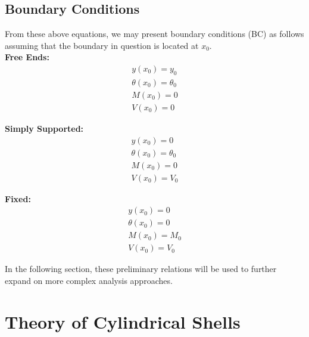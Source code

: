 \subsection{Boundary Conditions}

From these above equations, we may present boundary conditions (BC) as follows assuming that the boundary in question is located at $x_0$.\\

\textbf{Free Ends:}\\
\begin{equation}
	\label{eq:2_freeBC}
	\begin{aligned}
		y(x_0) = y_0          \\
		\theta(x_0)= \theta_0 \\
		M(x_0) = 0            \\
		V(x_0) = 0            
	\end{aligned}
\end{equation}

\textbf{Simply Supported:}\\
\begin{equation}
	\label{eq:2_endBC}
	\begin{aligned}
		y(x_0)= 0            \\
		\theta(x_0)=\theta_0 \\
		M(x_0)= 0            \\
		V(x_0) =V_0          
	\end{aligned}
\end{equation}

\textbf{Fixed:}\\
\begin{equation}
	\label{eq:2_fixedBC}
	\begin{aligned}
		y(x_0)=0      \\
		\theta(x_0)=0 \\
		M(x_0)=M_0    \\
		V(x_0) =V_0   
	\end{aligned}
\end{equation}

In the following section, these preliminary relations will be used to further expand on more complex analysis approaches.

\section{Theory of Cylindrical Shells}

